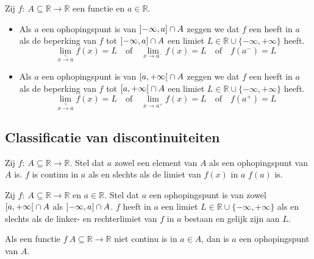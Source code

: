 \documentclass[main.tex]{subfiles}
\begin{document}
\begin{de}
  Zij $f:\ A \subseteq \mathbb{R} \rightarrow \mathbb{R}$ een functie en $a\in \mathbb{R}$.
  \begin{itemize}
  \item Als $a$ een ophopingspunt is van $\interval[open left]{-\infty}{a} \cap A$ zeggen we dat $f$ een  heeft in $a$ als de beperking van $f$ tot $\interval[open left]{-\infty}{a} \cap A$ een limiet $L \in \mathbb{R} \cup \{ -\infty, +\infty \}$ heeft.
    \[ \lim_{x \overset{<}{\rightarrow} a}f(x) = L \quad\text{of}\quad \lim_{x \rightarrow a^{-}}f(x) = L \quad\text{of}\quad f(a^{-}) = L \]
  \item Als $a$ een ophopingspunt is van $\interval[open right]{a}{+\infty} \cap A$ zeggen we dat $f$ een  heeft in $a$ als de beperking van $f$ tot $\interval[open right]{a}{+\infty} \cap A$ een limiet $L \in \mathbb{R} \cup \{ -\infty, +\infty \}$ heeft.
    \[ \lim_{x \overset{>}{\rightarrow} a}f(x) = L \quad\text{of}\quad \lim_{x \rightarrow a^{+}}f(x) = L \quad\text{of}\quad f(a^{+}) = L \]
  \end{itemize}
\end{de}

\subsection{Classificatie van discontinuiteiten}

\begin{pr}
  Zij $f:\ A \subseteq \mathbb{R} \rightarrow \mathbb{R}$.
  Stel dat $a$ zowel een element van $A$ als een ophopingspunt van $A$ is.
  $f$ is continu in $a$ als en slechts als de limiet van $f(x)$ in $a$ $f(a)$ is.
\end{pr}

\begin{pr}
  Zij $f:\ A \subseteq \mathbb{R} \rightarrow \mathbb{R}$ en $a\in \mathbb{R}$.
  Stel dat $a$ een ophopingspunt is van zowel $\interval[open right]{a}{+\infty} \cap A$ als $\interval[open left]{-\infty}{a} \cap A$.
  $f$ heeft in $a$ een limiet $L\in \mathbb{R}\cup \{ -\infty,+\infty\}$ als en slechts als de linker- en rechterlimiet van $f$ in $a$ bestaan en gelijk zijn aan $L$.
\end{pr}

\begin{pr}
  Als een functie $f\ A \subseteq \mathbb{R} \rightarrow \mathbb{R}$ niet continu is in $a\in A$, dan is $a$ een ophopingspunt van $A$.
\end{pr}
\end{document}
